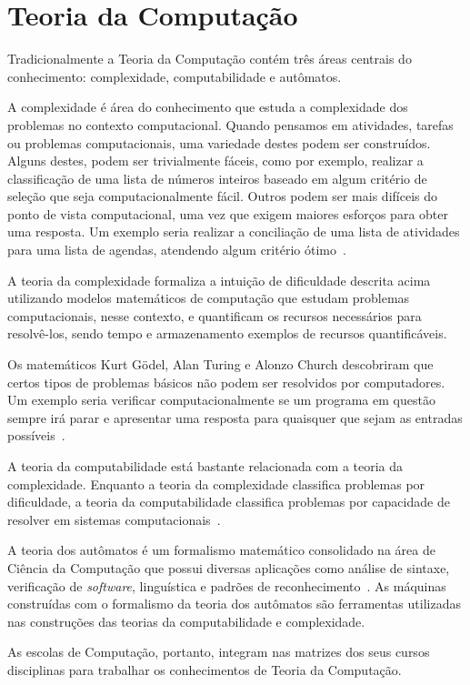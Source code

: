\section{Teoria da Computação}
\label{sec-revisao-teocomp}
Tradicionalmente a Teoria da Computação contém três áreas centrais
do conhecimento: complexidade, computabilidade e autômatos.

A complexidade é área do conhecimento que estuda a complexidade
dos problemas no contexto computacional.
Quando pensamos em atividades, tarefas ou problemas computacionais,
uma variedade destes podem ser construídos.
Alguns destes, podem ser trivialmente fáceis, como por exemplo,
realizar a classificação de uma lista de números inteiros baseado
em algum critério de seleção que seja computacionalmente fácil.
Outros podem ser mais difíceis do ponto de vista computacional,
uma vez que exigem maiores esforços para obter uma resposta.
Um exemplo seria
realizar a conciliação de uma lista de atividades para uma lista
de agendas, atendendo algum critério
ótimo~\cite{sipser2006introduction}.

A teoria da complexidade formaliza a intuição de dificuldade descrita acima
utilizando modelos matemáticos de computação que estudam problemas
computacionais, nesse contexto, e quantificam os recursos necessários
para resolvê-los, sendo tempo e armazenamento exemplos de recursos
quantificáveis.

Os matemáticos Kurt G{\"o}del, Alan Turing e Alonzo Church descobriram que
certos tipos de problemas básicos não podem ser
resolvidos por computadores.
Um exemplo seria verificar computacionalmente se um programa em questão
sempre irá parar e apresentar uma resposta para quaisquer que sejam
as entradas possíveis~\cite{sipser2006introduction}.

A teoria da computabilidade está bastante relacionada com a teoria da complexidade.
Enquanto a teoria da complexidade classifica problemas por dificuldade, a teoria
da computabilidade classifica problemas por capacidade de resolver em sistemas
computacionais~\cite{sipser2006introduction}.

A teoria dos autômatos é um formalismo matemático consolidado na área de
Ciência da Computação que possui diversas aplicações como análise de sintaxe,
verificação de \textit{software}, linguística e padrões
de reconhecimento~\cite{pin2011elements}.
As máquinas construídas com o formalismo da teoria dos autômatos são ferramentas
utilizadas nas construções das teorias da computabilidade
e complexidade.

As escolas de Computação, portanto, integram nas matrizes dos seus cursos disciplinas
para trabalhar os conhecimentos de Teoria da Computação.
